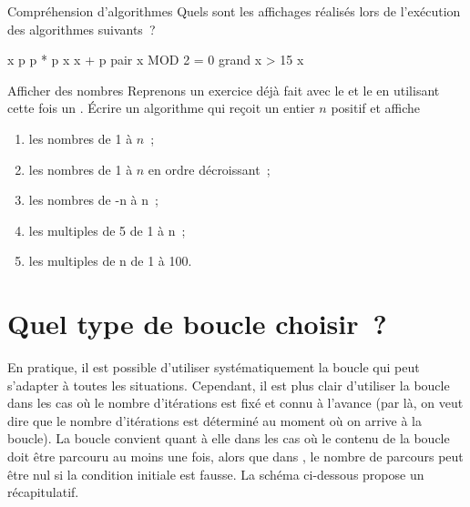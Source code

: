 		\begin{Exercice}{Compréhension d’algorithmes}
			Quels sont les affichages réalisés lors de l’exécution
			des algorithmes suivants~?

			\begin{LDA}
					\Let x 
					\Let p 
					\Repeat
						\Let p  * p
						\Let x \Gets x + p
						\Let pair \Gets x MOD 2 = 0
						\Let grand \Gets x > 15
					\Write x
				\EndAlgo
			\end{LDA}		
		
		\end{Exercice}

		\begin{Exercice}{Afficher des nombres}
			Reprenons un exercice déjà fait avec le \lda{\algorithmicwhile}
			et le \lda{\algorithmicfor}
			en utilisant cette fois un \lda{\algorithmicrepeat} \lda{\algorithmicwhile}.
			Écrire un algorithme qui reçoit un entier $n$ positif et affiche
			\begin{enumerate}[label=\alph*)]
			\item les nombres de 1 à $n$~;
			\item les nombres de 1 à $n$ en ordre décroissant~;
			\item les nombres de -n à n~;
			\item les multiples de 5 de 1 à n~;
			\item les multiples de n de 1 à 100.
			\end{enumerate}
		\end{Exercice}

\section{Quel type de boucle choisir~?}

	En pratique, il est possible d’utiliser systématiquement la boucle 
	 qui peut s’adapter à toutes les situations. 
	Cependant, il est plus clair d’utiliser la boucle  
	dans les cas où le nombre d’itérations est fixé et connu à l’avance 
	(par là, on veut dire que le nombre d’itérations est déterminé au moment 
	où on arrive à la boucle). 
	La boucle  convient quant à elle
	dans les cas où le contenu de la boucle doit être parcouru au moins une
	fois, alors que dans , 
	le nombre de parcours peut être nul si la condition initiale est fausse. 
	La schéma ci-dessous propose un récapitulatif.

